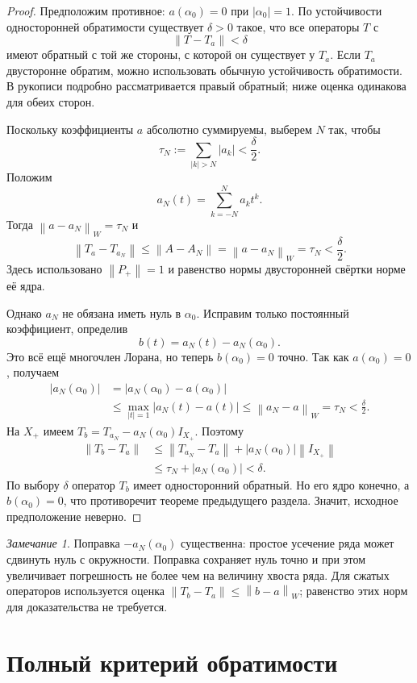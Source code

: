 \documentclass[12pt,a4paper]{article}
\theoremstyle{definition}
\theoremstyle{remark}
\newtheorem*{remark}{Замечание}
\newcommand{\norm}[1]{\left\lVert #1\right\rVert}
\begin{document}
\begin{proof}
Предположим противное: $a(\alpha_0)=0$ при $|\alpha_0|=1$.
По устойчивости односторонней обратимости существует $\delta>0$
такое, что все операторы $T$ с
\[
  \norm{T-T_a}<\delta
\]
имеют обратный с той же стороны, с которой он существует у $T_a$.
Если $T_a$ двусторонне обратим, можно использовать обычную
устойчивость обратимости. В рукописи подробно рассматривается
правый обратный; ниже оценка одинакова для обеих сторон.

Поскольку коэффициенты $a$ абсолютно суммируемы, выберем $N$ так, чтобы
\[
  \tau_N:=\sum_{|k|>N}|a_k|<\frac\delta2.
\]
Положим
\[
  a_N(t)=\sum_{k=-N}^{N}a_kt^k.
\]
Тогда $\norm{a-a_N}_W=\tau_N$ и
\[
  \norm{T_a-T_{a_N}}
  \leqslant\norm{A-A_N}=\norm{a-a_N}_W=\tau_N<\frac\delta2.
\]
Здесь использовано $\norm{P_+}=1$ и равенство нормы двусторонней
свёртки норме её ядра.

Однако $a_N$ не обязана иметь нуль в $\alpha_0$. Исправим только
постоянный коэффициент, определив
\[
  \boxed{b(t)=a_N(t)-a_N(\alpha_0)}.
\]
Это всё ещё многочлен Лорана, но теперь $b(\alpha_0)=0$ точно.
Так как $a(\alpha_0)=0$, получаем
\begin{align*}
  |a_N(\alpha_0)|
  &=|a_N(\alpha_0)-a(\alpha_0)|\\
  &\leqslant\max_{|t|=1}|a_N(t)-a(t)|
   \leqslant\norm{a_N-a}_W=\tau_N<\frac\delta2.
\end{align*}
На $X_+$ имеем $T_b=T_{a_N}-a_N(\alpha_0)I_{X_+}$. Поэтому
\begin{align*}
  \norm{T_b-T_a}
  &\leqslant\norm{T_{a_N}-T_a}+|a_N(\alpha_0)|\norm{I_{X_+}}\\
  &\leqslant\tau_N+|a_N(\alpha_0)|<\delta.
\end{align*}
По выбору $\delta$ оператор $T_b$ имеет односторонний обратный.
Но его ядро конечно, а $b(\alpha_0)=0$, что противоречит теореме
предыдущего раздела. Значит, исходное предположение неверно.
\end{proof}

\begin{remark}
Поправка $-a_N(\alpha_0)$ существенна: простое усечение ряда может
сдвинуть нуль с окружности. Поправка сохраняет нуль точно и при этом
увеличивает погрешность не более чем на величину хвоста ряда.
Для сжатых операторов используется оценка
$\norm{T_b-T_a}\leqslant\norm{b-a}_W$; равенство этих норм
для доказательства не требуется.
\end{remark}

\section{Полный критерий обратимости}
\end{document}

